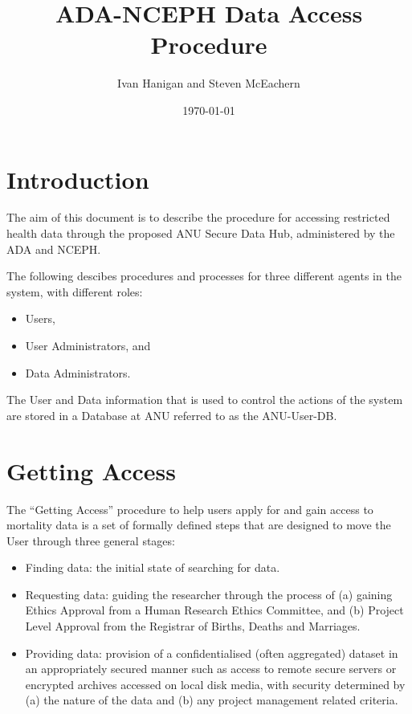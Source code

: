\documentclass[a4paper]{article}
\title{ADA-NCEPH Data Access Procedure}
\author{Ivan Hanigan and Steven McEachern}
\date{\today}
\begin{document}
\maketitle

\tableofcontents

\section{Introduction}
\label{sec-1}

The aim of this document is to describe the procedure for accessing restricted health data through the proposed ANU Secure Data Hub, administered by the ADA and NCEPH.

The following descibes procedures and processes for three different agents in the system, with different roles:
\begin{itemize}
\item Users,
\item User Administrators, and
\item Data Administrators.
\end{itemize}

The User and Data information that is used to control the actions of the system are stored in a Database at ANU referred to as the ANU-User-DB.
\newpage
\section{Getting Access}
\label{sec-2}

The ``Getting Access'' procedure to help users apply for and gain access to mortality data is a set of formally defined steps that are designed to move the User through three general stages:
\begin{itemize}
\item Finding data: the initial state of searching for data.
\item Requesting data: guiding the researcher through the process of (a) gaining Ethics Approval from a Human Research Ethics Committee, and (b) Project Level Approval from the Registrar of Births, Deaths and Marriages.
\item Providing data: provision of a confidentialised (often aggregated) dataset in an appropriately secured manner such as access to remote secure servers or encrypted archives accessed on local disk media, with security determined by (a) the nature of the data and (b) any project management related criteria.
\end{itemize}
\end{document}
